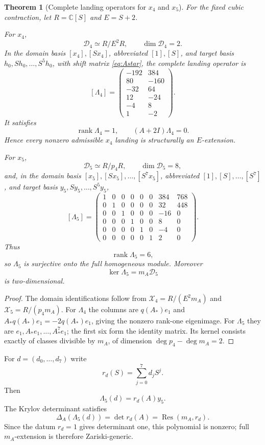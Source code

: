 \documentclass[11pt]{amsart}
\newtheorem{theorem}{Theorem}[section]
\newcommand{\rank}{\operatorname{rank}}
\newcommand{\C}{\mathbb C}
\begin{document}
\begin{theorem}[Complete landing operators for $x_4$ and $x_5$]\label{thm:complete-landing}
For the fixed cubic contraction, let $R=\C[S]$ and $E=S+2$.

For $x_4$,
\[
\mathscr D_4\simeq R/E^2R,
\qquad
\dim\mathscr D_4=2.
\]
In the domain basis $[x_4],[Sx_4]$, abbreviated $[1],[S]$, and target
basis $h_0,Sh_0,\ldots,S^5h_0$, with shift matrix \eqref{eq:Astar},
the complete landing operator is
\[
[\Lambda_4]=
\begin{pmatrix}
-192&384\\
80&-160\\
-32&64\\
12&-24\\
-4&8\\
1&-2
\end{pmatrix}.
\]
It satisfies
\[
\boxed{\rank\Lambda_4=1,
\qquad
(A+2I)\Lambda_4=0.}
\]
Hence every nonzero admissible $x_4$ landing is structurally an $E$-extension.

For $x_5$,
\[
\mathscr D_5\simeq R/p_4R,
\qquad
\dim\mathscr D_5=8,
\]
and, in the domain basis $[x_5],[Sx_5],\ldots,[S^7x_5]$,
abbreviated $[1],[S],\ldots,[S^7]$, and target basis
$y_5,Sy_5,\ldots,S^5y_5$,
\[
[\Lambda_5]=
\begin{pmatrix}
1&0&0&0&0&0&384&768\\
0&1&0&0&0&0&32&448\\
0&0&1&0&0&0&-16&0\\
0&0&0&1&0&0&8&0\\
0&0&0&0&1&0&-4&0\\
0&0&0&0&0&1&2&0
\end{pmatrix}.
\]
Thus
\[
\boxed{\rank\Lambda_5=6,}
\]
so $\Lambda_5$ is surjective onto the full homogeneous module.  Moreover
\[
\ker\Lambda_5=m_A\mathscr D_5
\]
is two-dimensional.
\end{theorem}
\begin{proof}
The domain identifications follow from
$\mathcal X_4=R/(E^2m_A)$ and $\mathcal X_5=R/(p_4m_A)$.
For $\Lambda_4$ the columns are $q(A_*)e_1$ and
$A_*q(A_*)e_1=-2q(A_*)e_1$, giving the nonzero rank-one eigenimage.
For $\Lambda_5$ they are $e_1,A_*e_1,\ldots,A_*^7e_1$;
the first six form the identity matrix. Its kernel consists exactly of
classes divisible by $m_A$, of dimension $\deg p_4-\deg m_A=2$.
\end{proof}

For $d=(d_0,\ldots,d_7)$ write
\[
r_d(S)=\sum_{j=0}^7d_jS^j.
\]
Then
\[
\Lambda_5(d)=r_d(A)y_5.
\]
The Krylov determinant satisfies
\begin{equation}\label{eq:landing-resultant}
\boxed{
\Delta_A(\Lambda_5(d))
=\det r_d(A)
=\operatorname{Res}(m_A,r_d).
}
\end{equation}
Since the datum $r_d=1$ gives determinant one, this polynomial is nonzero; full $m_A$-extension is therefore Zariski-generic.
\end{document}
